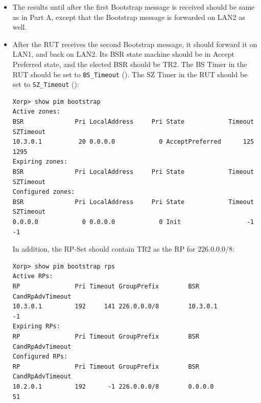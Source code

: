 \documentclass[11pt]{report}
\begin{document}

\begin{itemize}

  \item The results until after the first Bootstrap message is received should
  be same as in Part A, except that the Bootstrap message is forwarded on LAN2
  as well.

  \item After the RUT receives the second Bootstrap message, it should forward
        it on LAN1, and back on LAN2. Its BSR state machine
        should be in Accept Preferred state, and the elected BSR should be TR2.
        The BS Timer in the RUT should be set to \verb=BS_Timeout=
        ({\PimsmBSTimeout}).
        The SZ Timer in the RUT should be set to \verb=SZ_Timeout=
        ({\PimsmSZTimeout}):

\begin{verbatim}
Xorp> show pim bootstrap 
Active zones:
BSR              Pri LocalAddress     Pri State            Timeout SZTimeout
10.3.0.1          20 0.0.0.0            0 AcceptPreferred      125      1295
Expiring zones:
BSR              Pri LocalAddress     Pri State            Timeout SZTimeout
Configured zones:
BSR              Pri LocalAddress     Pri State            Timeout SZTimeout
0.0.0.0            0 0.0.0.0            0 Init                  -1        -1
\end{verbatim}

  In addition, the RP-Set should contain TR2 as the RP for 226.0.0.0/8:

\begin{verbatim}
Xorp> show pim bootstrap rps 
Active RPs:
RP               Pri Timeout GroupPrefix        BSR         CandRpAdvTimeout
10.3.0.1         192     141 226.0.0.0/8        10.3.0.1                  -1
Expiring RPs:
RP               Pri Timeout GroupPrefix        BSR         CandRpAdvTimeout
Configured RPs:
RP               Pri Timeout GroupPrefix        BSR         CandRpAdvTimeout
10.2.0.1         192      -1 226.0.0.0/8        0.0.0.0                   51
\end{verbatim}

\end{itemize}

\end{document}
